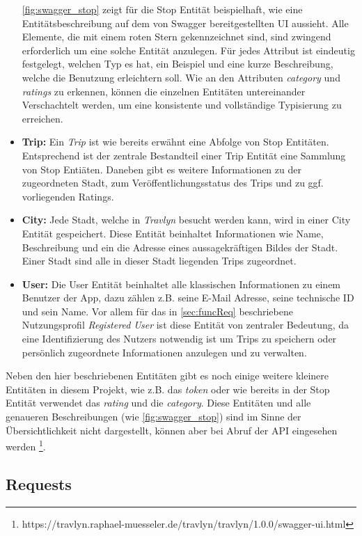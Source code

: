 \begin{itemize}
		\autoref{fig:swagger_stop} zeigt für die Stop Entität beispielhaft, wie eine Entitätsbeschreibung auf dem von Swagger bereitgestellten UI aussieht. Alle Elemente, die mit einem roten Stern gekennzeichnet sind, sind zwingend erforderlich um eine solche Entität anzulegen. Für jedes Attribut ist eindeutig festgelegt, welchen Typ es hat, ein Beispiel und eine kurze Beschreibung, welche die Benutzung erleichtern soll. Wie an den Attributen \textit{category} und \textit{ratings} zu erkennen, können die einzelnen Entitäten untereinander Verschachtelt werden, um eine konsistente und vollständige Typisierung zu erreichen.   
		\item \textbf{Trip:} Ein \textit{Trip} ist wie bereits erwähnt eine Abfolge von Stop Entitäten. Entsprechend ist der zentrale Bestandteil einer Trip Entität eine Sammlung von Stop Entiäten. Daneben gibt es weitere Informationen zu der zugeordneten Stadt, zum Veröffentlichungsstatus des Trips und zu ggf. vorliegenden Ratings.
		\item \textbf{City:} Jede Stadt, welche in \textit{Travlyn} besucht werden kann, wird in einer City Entität gespeichert. Diese Entität beinhaltet Informationen wie Name, Beschreibung und ein die Adresse eines aussagekräftigen Bildes der Stadt. Einer Stadt sind alle in dieser Stadt liegenden Trips zugeordnet. 
		\item \textbf{User:} Die User Entität beinhaltet alle klassischen Informationen zu einem Benutzer der App, dazu zählen z.B. seine E-Mail Adresse, seine technische ID und sein Name. Vor allem für das in  \autoref{sec:funcReq} beschriebene Nutzungsprofil \textit{Registered User} ist diese Entität von zentraler Bedeutung, da eine Identifizierung des Nutzers notwendig ist um Trips zu speichern oder persönlich zugeordnete Informationen anzulegen und zu verwalten.
	\end{itemize}

	Neben den hier beschriebenen Entitäten gibt es noch einige weitere kleinere Entitäten in diesem Projekt, wie z.B. das \textit{token} oder wie bereits in der Stop Entität verwendet das \textit{rating} und die \textit{category}. Diese Entitäten und alle genaueren Beschreibungen (wie \autoref{fig:swagger_stop}) sind im Sinne der Übersichtlichkeit nicht dargestellt, können aber bei Abruf der API eingesehen werden \footnote{https://travlyn.raphael-muesseler.de/travlyn/travlyn/1.0.0/swagger-ui.html}.
	
	\subsection{Requests}
	
